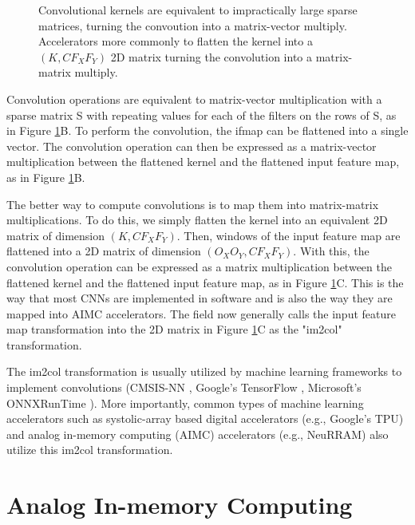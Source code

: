 \begin{figure}[htbp]
    \centering
    
    \caption{Convolutional kernels are equivalent to impractically large sparse matrices, turning the convoution into a matrix-vector multiply. Accelerators more commonly to flatten the kernel into a $(K,CF_XF_Y)$ 2D matrix turning the convolution into a matrix-matrix multiply.}
    \label{fig:conv_flattening}
\end{figure}

Convolution operations are equivalent to matrix-vector multiplication with a sparse matrix S with repeating values for each of the filters on the rows of S, as in Figure \ref{fig:conv_flattening}B. To perform the convolution, the ifmap can be flattened into a single vector. The convolution operation can then be expressed as a matrix-vector multiplication between the flattened kernel and the flattened input feature map, as in Figure \ref{fig:conv_flattening}B. 

The better way to compute convolutions is to map them into matrix-matrix multiplications. To do this, we simply flatten the kernel into an equivalent 2D matrix of dimension $(K,CF_XF_Y)$. Then, windows of the input feature map are flattened into a 2D matrix of dimension $(O_XO_Y,CF_XF_Y)$. With this, the convolution operation can be expressed as a matrix multiplication between the flattened kernel and the flattened input feature map, as in Figure \ref{fig:conv_flattening}C. This is the way that most CNNs are implemented in software and is also the way they are mapped into AIMC accelerators. The field now generally calls the input feature map transformation into the 2D matrix in Figure \ref{fig:conv_flattening}C as the "im2col" transformation.

The im2col transformation is usually utilized by machine learning frameworks to implement convolutions (CMSIS-NN \cite{lai2018cmsis}, Google's TensorFlow \cite{jacob2018quantization}, Microsoft's ONNXRunTime \cite{onnxruntime} ). More importantly, common types of machine learning accelerators such as systolic-array based digital accelerators (e.g., Google's TPU) \cite{jouppi2017datacenter} and analog in-memory computing (AIMC) accelerators (e.g., NeuRRAM) \cite{wanneurram} also utilize this im2col transformation.

\section{Analog In-memory Computing} 
 
